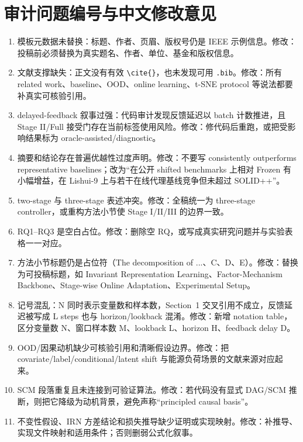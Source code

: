 ﻿\documentclass[journal]{IEEEtran}
\newcommand{\auditid}[1]{\textcolor{auditred}{\textbf{[#1]}}}
\begin{document}
\section*{\textcolor{auditred}{审计问题编号与中文修改意见}}
\small
\begin{enumerate}
\item[\auditid{P01}] 模板元数据未替换：标题、作者、页眉、版权号仍是 IEEE 示例信息。修改：投稿前必须替换为真实题名、作者、单位、基金和版权信息。
\item[\auditid{P02}] 文献支撑缺失：正文没有有效 \texttt{\textbackslash cite\{\}}，也未发现可用 \texttt{.bib}。修改：所有 related work、baseline、OOD、online learning、t-SNE protocol 等说法都要补真实可核验引用。
\item[\auditid{P03}] delayed-feedback 叙事过强：代码审计发现反馈延迟以 batch 计数推进，且 Stage II/Full 接受门存在当前标签使用风险。修改：修代码后重跑，或把受影响结果标为 oracle-assisted/diagnostic。
\item[\auditid{P04}] 摘要和结论存在普遍优越性过度声明。修改：不要写 consistently outperforms representative baselines；改为“在公开 shifted benchmarks 上相对 Frozen 有小幅增益，在 Lishui-9 上与若干在线代理基线竞争但未超过 SOLID++”。
\item[\auditid{P05}] two-stage 与 three-stage 表述冲突。修改：全稿统一为 three-stage controller，或重构方法小节使 Stage I/II/III 的边界一致。
\item[\auditid{P06}] RQ1--RQ3 是空白占位。修改：删除空 RQ，或写成真实研究问题并与实验表格一一对应。
\item[\auditid{P07}] 方法小节标题仍是占位符（The decomposition of ...、C、D、E）。修改：替换为可投稿标题，如 Invariant Representation Learning、Factor-Mechanism Backbone、Stage-wise Online Adaptation、Experimental Setup。
\item[\auditid{P08}] 记号混乱：N 同时表示变量数和样本数，Section~1 交叉引用不成立，反馈延迟被写成 L steps 也与 horizon/lookback 混淆。修改：新增 notation table，区分变量数 N、窗口样本数 M、lookback L、horizon H、feedback delay D。
\item[\auditid{P09}] OOD/因果动机缺少可核验引用和清晰假设边界。修改：把 covariate/label/conditional/latent shift 与能源负荷场景的文献来源对应起来。
\item[\auditid{P10}] SCM 段落重复且未连接到可验证算法。修改：若代码没有显式 DAG/SCM 推断，则把它降级为动机背景，避免声称“principled causal basis”。
\item[\auditid{P11}] 不变性假设、IRN 方差结论和损失推导缺少证明或实现映射。修改：补推导、实现文件映射和适用条件；否则删弱公式化叙事。

\end{enumerate}
\end{document}
